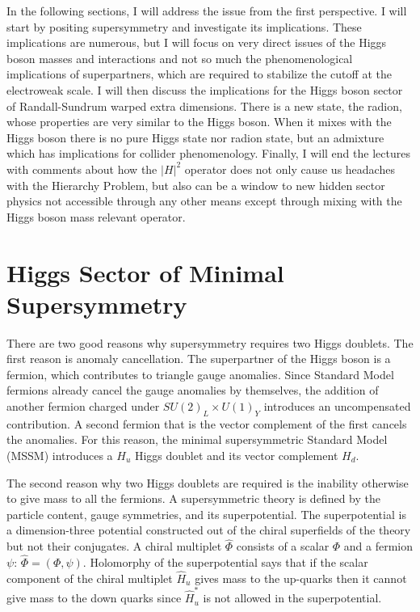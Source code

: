 \documentclass[12pt]{article}
\def\xsection#1{\section{#1}}
\begin{document}
In the following sections, I will address the issue from the first perspective. I will start by positing  supersymmetry and investigate its implications. These implications are numerous, but I will focus on very direct issues of the Higgs boson masses and interactions and not so much the phenomenological implications of superpartners, which are required to stabilize the cutoff at the electroweak scale.  I will then discuss the implications for the Higgs boson sector of Randall-Sundrum warped extra dimensions. There is a new state, the radion, whose properties are very similar to the Higgs boson. When it mixes with the Higgs boson there is no pure Higgs state nor radion state, but an admixture which has implications for collider phenomenology.  Finally, I will end the lectures with comments about how the $|H|^2$ operator does not only cause us headaches with the Hierarchy Problem, but also can be a window to new hidden sector physics not accessible through any other means except through mixing with the Higgs boson mass relevant operator. 



\xsection{Higgs Sector of Minimal Supersymmetry\label{susy higgs lecture}}

There are two good reasons why supersymmetry requires two Higgs doublets.  The first reason is anomaly cancellation. The superpartner of the Higgs boson is a fermion, which contributes to triangle gauge anomalies. Since Standard Model fermions already cancel the gauge anomalies by themselves, the addition of another fermion charged under $SU(2)_L\times U(1)_Y$ introduces an uncompensated contribution. A second fermion that is the vector complement of the first cancels the anomalies. For this reason, the minimal supersymmetric Standard Model (MSSM) introduces a $H_u$ Higgs doublet and its vector complement $H_d$.

The second reason why two Higgs doublets are required is the inability otherwise to give mass to all the fermions. A supersymmetric theory is defined by the particle content, gauge symmetries, and its superpotential.  The superpotential is a dimension-three potential constructed out of the chiral superfields of the theory but not their conjugates.  A chiral multiplet $\hat \Phi$ consists of a scalar $\Phi$ and a fermion $\psi$: $\hat\Phi=(\Phi,\psi)$. Holomorphy of the superpotential says that if the scalar component of the chiral multiplet $\hat H_u$ gives mass to the up-quarks then it cannot give mass to the down quarks since $\hat H^*_u$ is not allowed in the superpotential.  
\end{document}
